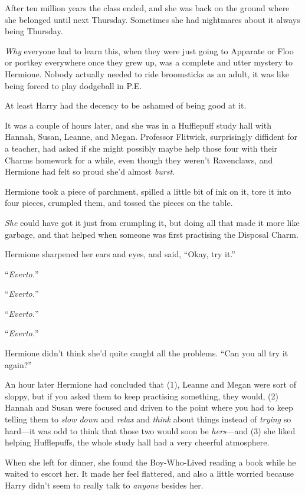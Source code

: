 After ten million years the class ended, and she was back on the ground where she belonged until next Thursday. Sometimes she had nightmares about it always being Thursday.

\emph{Why} everyone had to learn this, when they were just going to Apparate or Floo or portkey everywhere once they grew up, was a complete and utter mystery to Hermione. Nobody actually needed to ride broomsticks as an adult, it was like being forced to play dodgeball in P.E.

At least Harry had the decency to be ashamed of being good at it.

\later

It was a couple of hours later, and she was in a Hufflepuff study hall with Hannah, Susan, Leanne, and Megan. Professor Flitwick, surprisingly diffident for a teacher, had asked if she might possibly maybe help those four with their Charms homework for a while, even though they weren’t Ravenclaws, and Hermione had felt so proud she’d almost \emph{burst}.

Hermione took a piece of parchment, spilled a little bit of ink on it, tore it into four pieces, crumpled them, and tossed the pieces on the table.

\emph{She} could have got it just from crumpling it, but doing all that made it more like garbage, and that helped when someone was first practising the Disposal Charm.

Hermione sharpened her ears and eyes, and said, “Okay, try it.”

“\emph{Everto.}”

“\emph{Everto.}”

“\emph{Everto.}”

“\emph{Everto.}”

Hermione didn’t think she’d quite caught all the problems. “Can you all try it again?”

An hour later Hermione had concluded that (1), Leanne and Megan were sort of sloppy, but if you asked them to keep practising something, they would, (2) Hannah and Susan were focused and driven to the point where you had to keep telling them to \emph{slow down} and \emph{relax} and \emph{think} about things instead of \emph{trying} so hard—it was odd to think that those two would soon be \emph{hers}—and (3) she liked helping Hufflepuffs, the whole study hall had a very cheerful atmosphere.

When she left for dinner, she found the Boy-Who-Lived reading a book while he waited to escort her. It made her feel flattered, and also a little worried because Harry didn’t seem to really talk to \emph{anyone} besides her.

